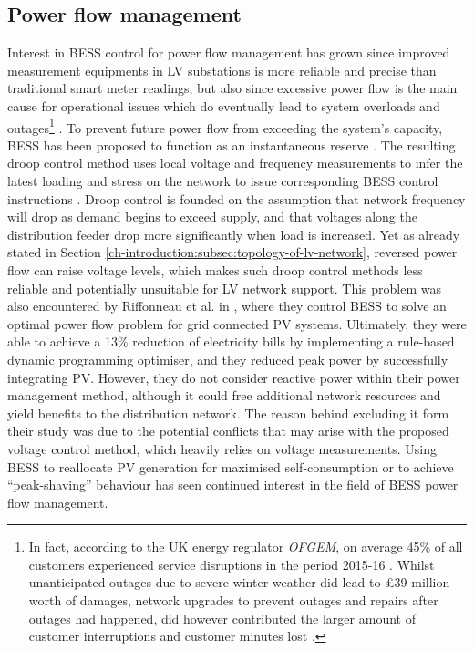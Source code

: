 \subsection{Power flow management}

Interest in BESS control for power flow management has grown since improved measurement equipments in LV substations is more reliable and precise than traditional smart meter readings, but also since excessive power flow is the main cause for operational issues which do eventually lead to system overloads and outages\footnote{
In fact, according to the UK energy regulator \textit{OFGEM}, on average 45\% of all customers experienced service disruptions in the period 2015-16 \cite{Ofgem2017}.
Whilst unanticipated outages due to severe winter weather did lead to \pounds39 million worth of damages, network upgrades to prevent outages and repairs after outages had happened, did however contributed the larger amount of customer interruptions and customer minutes lost \cite{Ofgem2014}.
} \cite{Putrus2009, Pillai2010}.
To prevent future power flow from exceeding the system's capacity, BESS has been proposed to function as an instantaneous reserve \cite{Kunisch1986a, Kunisch1986}.
The resulting droop control method uses local voltage and frequency measurements to infer the latest loading and stress on the network to issue corresponding BESS control instructions \cite{Engler2005a}.
Droop control is founded on the assumption that network frequency will drop as demand begins to exceed supply, and that voltages along the distribution feeder drop more significantly when load is increased.
Yet as already stated in Section \ref{ch-introduction:subsec:topology-of-lv-network}, reversed power flow can raise voltage levels, which makes such droop control methods less reliable and potentially unsuitable for LV network support.
This problem was also encountered by Riffonneau et al. in \cite{Riffonneau2011}, where they control BESS to solve an optimal power flow problem for grid connected PV systems.
Ultimately, they were able to achieve a 13\% reduction of electricity bills by implementing a rule-based dynamic programming optimiser, and they reduced peak power by successfully integrating PV.
However, they do not consider reactive power within their power management method, although it could free additional network resources and yield benefits to the distribution network.
The reason behind excluding it form their study was due to the potential conflicts that may arise with the proposed voltage control method, which heavily relies on voltage measurements.
Using BESS to reallocate PV generation for maximised self-consumption \cite{SaniHassan2017} or to achieve ``peak-shaving'' behaviour \cite{Bennett2015, DePaola2016} has seen continued interest in the field of BESS power flow management.

